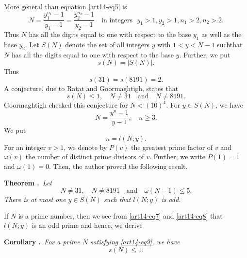 More general than equation \eqref{art14-eq5} is 
$$
N=\dfrac{y^{n_{1}}_{1}-1}{y_{1}-1}=\dfrac{y^{n_{2}}_{2}-1}{y_{2}-1}\quad\text{in integers~ } y_{1}>1, y_{2}>1, n_{1}>2,n_{2}>2.
$$
Thus $N$ has all the digits equal to one with respect to the base $y_{1}$ as well as the base $y_{2}$. Let $S(N)$ denote the set of all integers $y$ with $1<y<N-1$ such\pageoriginale that $N$ has all the digits equal to one with respect to the base $y$. Further, we put
$$
s(N)=|S(N)|.
$$
Thus
$$
s(31)=s(8191)=2.
$$
A conjecture, due to Ratat and Goormaghtigh, states that
\begin{equation}
s(N)\leq 1,\quad N\neq 31\text{~~ and~~ } N\neq 8191.
\end{equation}
Goormaghtigh \cite{art14-key11} checked this conjecture for $N<(10)^{4}$. For $y\in S(N)$, we have
\begin{equation}
N=\dfrac{y^{n}-1}{y-1},\quad n\geq 3.\label{art14-eq7}
\end{equation}
We put
\begin{equation}
n=l(N; y).\label{art14-eq8}
\end{equation}
For an integer $v>1$, we denote by $P(v)$ the greatest prime factor of $v$ and $\omega(v)$ the number of distinct prime divisors of $v$. Further, we write $P(1)=1$ and $\omega(1)=0$. Then, the author \cite{art14-key29} proved the following result.

\medskip
\noindent
{\bf Theorem .\label{art14-thm1}}~{\em Let}
\begin{equation}
N\neq 31,\quad N\neq 8191\text{~~ and~~ } \omega(N-1)\leq 5.
\end{equation}
{\em There is at most one $y\in S(N)$ such that $l(N;y)$ is odd.}

If $N$ is a prime number, then we see from \eqref{art14-eq7} and \eqref{art14-eq8} that $l(N;y)$ is an odd prime and hence, we derive

\medskip
\noindent
{\bf Corollary .\label{art14-coro1}}~{\em For a prime $N$ satisfying \eqref{art14-eq9}, we have}
$$
s(N)\leq 1.
$$

